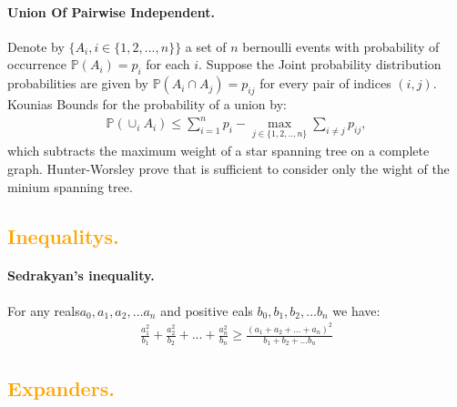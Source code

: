\documentclass{article}
\begin{document}
\begin{multicols*}{2}
  \paragraph{Union Of Pairwise Independent.}  Denote by $\{{A}_i, i \in \{1,2,...,n\}\}$ a set of  $n$ bernoulli events with probability of occurrence $\mathbb{P}(A_{i})=p_i$  for each $i$. Suppose the Joint probability distribution probabilities are given by $\mathbb{P}(A_{i} \cap A_{j})=p_{ij}$ for every pair of indices $(i,j)$. Kounias Bounds for the probability of a union by:
  \begin{equation*}
    \begin{split}
        \mathbb{P}(\displaystyle {\cup}_iA_{i}) \le  \sum_{i=1}^n p_{i}-\underset {j\in \{1,2,..,n\}}{\max} \sum_{i\neq j} p_{ij}, 
    \end{split}
  \end{equation*}
  which subtracts the maximum weight of a star spanning tree on a complete graph. Hunter-Worsley prove that is sufficient to consider only the wight of the minium spanning tree.
  \subsection*{{\textcolor{orange}{Inequalitys.}} } 
  \paragraph{Sedrakyan's inequality.} For any reals$a_{0},a_{1},a_{2},\ldots a_{n}$ and positive eals $b_{0},b_{1},b_{2},\ldots b_{n}$ we have:  
  \begin{equation*}
    \begin{split}
      \frac{a_{1}^2}{b_{1}}+\frac{a_{2}^2}{b_{2}}+ ...+ \frac{a_{n}^2}{b_{n}} \ge \frac{\left( a_{1}+ a_{2} + ... + a_{n}  \right)^{2}}{b_{1}+b_{2}+... b_{n}}  
    \end{split}
  \end{equation*}
  \subsection*{{\textcolor{orange}{Expanders.}} } 

\end{multicols*}
\end{document}
